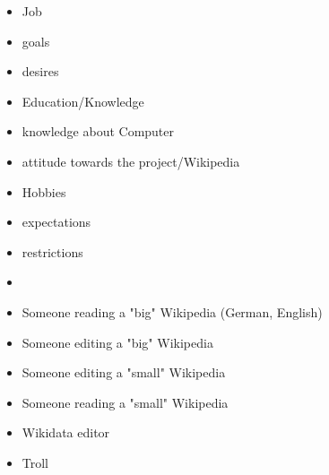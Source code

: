 \documentclass[11pt]{article}
\begin{document}
\begin{itemize}
\item Job
\item goals
\item desires
\item Education/Knowledge
\item knowledge about Computer
\item attitude towards the project/Wikipedia
\item Hobbies
\item expectations
\item restrictions

\item
\item Someone reading a "big" Wikipedia (German, English)
\item Someone editing a "big" Wikipedia
\item Someone editing a "small" Wikipedia
\item Someone reading a "small" Wikipedia 
\item Wikidata editor
\item Troll
\end{itemize}
\end{document}
